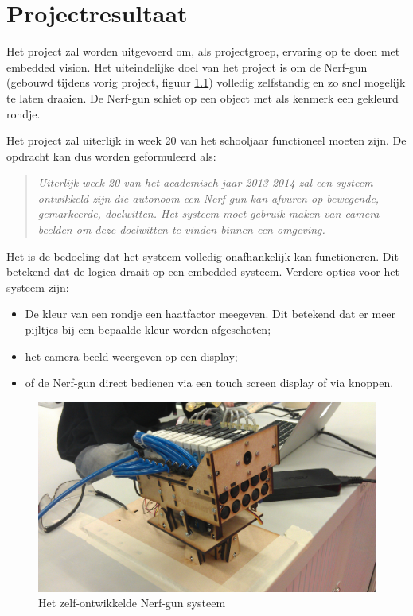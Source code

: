 \chapter{Projectresultaat}

Het project zal worden uitgevoerd om, als projectgroep, ervaring op te doen met
embedded vision. Het uiteindelijke doel van het project is om de Nerf-gun
(gebouwd tijdens vorig project, figuur \ref{fig:nerf}) volledig zelfstandig en
zo snel mogelijk te laten draaien. De Nerf-gun schiet op een object met als
kenmerk een gekleurd rondje.

Het project zal uiterlijk in week 20 van het schooljaar functioneel moeten
zijn. De opdracht kan dus worden geformuleerd als:

\begin{quotation}
\emph{Uiterlijk week 20 van het academisch jaar 2013-2014 zal een systeem
ontwikkeld zijn die autonoom een Nerf-gun kan afvuren op bewegende, gemarkeerde,
doelwitten. Het systeem moet gebruik maken van camera beelden om deze doelwitten
te vinden binnen een omgeving.}
\end{quotation}

Het is de bedoeling dat het systeem volledig onafhankelijk kan functioneren.
Dit betekend dat de logica draait op een embedded systeem. Verdere opties voor
het systeem zijn:

\begin{itemize}
    \item De kleur van een rondje een haatfactor meegeven. Dit betekend dat er
        meer pijltjes bij een bepaalde kleur worden afgeschoten;
    \item het camera beeld weergeven op een display;
    \item of de Nerf-gun direct bedienen via een touch screen display of via
        knoppen.
\end{itemize}

\begin{figure}
	\begin{center}
		\includegraphics[scale=0.1]{figures/autonerf.jpg}
	\end{center}
    \caption{Het zelf-ontwikkelde Nerf-gun systeem}
    \label{fig:nerf}
\end{figure}
